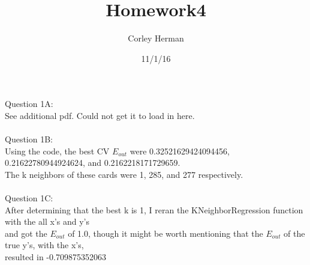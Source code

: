 \documentclass[a4paper]{article}
\title{Homework4}
\author{Corley Herman}
\date{11/1/16}
\begin{document}
\lstset{language=Python}

\maketitle

\noindent Question 1A:\\
See additional pdf. Could not get it to load in here.\\
\\
Question 1B:\\
Using the code, the best CV $E_{out}$ were 0.32521629424094456, 0.21622780944924624, and 0.2162218171729659.\\
The k neighbors of these cards were 1, 285, and 277 respectively.\\
\\
Question 1C:\\
After determining that the best k is 1, I reran the KNeighborRegression function with the all x's and y's\\
and got the $E_{out}$ of 1.0, though it might be worth mentioning that the $E_{out}$ of the true y's, with the x's,\\
resulted in -0.709875352063\\
\end{document}
